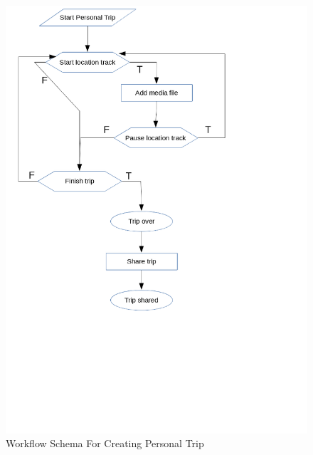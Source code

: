 \begin{figure}[!htbp]
\centering
\includegraphics[width=\textwidth]{projectChapters/images/personalTripWorkflow.png}
\caption{Workflow Schema For Creating Personal Trip}
\label{fig:personalTripWorkflow}
\end{figure}

